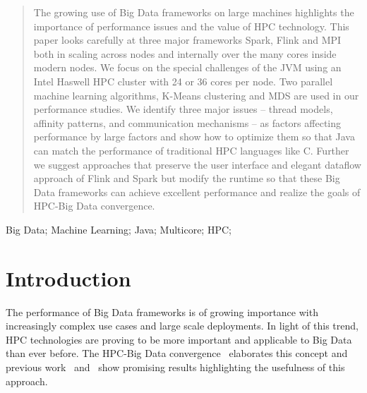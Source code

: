 \documentclass[10pt, conference, compsocconf]{IEEEtran}
\begin{document}
\begin{abstract}
The growing use of Big Data frameworks  on large machines highlights the importance of performance issues and the value of \ac{HPC} technology. This paper looks carefully at three major frameworks Spark, Flink and \ac{MPI} both in scaling across nodes and internally over the many cores inside modern nodes. We focus on the special challenges of the \ac{JVM}  using an Intel   Haswell   \ac{HPC}   cluster   with   24   or  36   cores per  node. Two parallel machine  learning  algorithms,  K-Means  clustering and  \ac{MDS} are used in our performance studies. We identify three major issues --  thread   models,   affinity   patterns,   and communication mechanisms -- as factors affecting performance by large factors and show how to optimize them so that Java can match the performance of traditional \ac{HPC} languages like C. Further we suggest approaches that preserve the user interface and elegant dataflow approach of Flink and Spark but modify the runtime so that these Big Data frameworks can achieve excellent performance and realize the goals of HPC-Big Data convergence.
\end{abstract}

\begin{IEEEkeywords}
Big Data; Machine Learning; Java; Multicore; HPC;
\end{IEEEkeywords}

\acresetall
%
\IEEEpeerreviewmaketitle



\section{Introduction} \label{sec:intro}

The performance of Big Data frameworks is of growing importance with increasingly complex use cases and large scale deployments. In light of this trend, \ac{HPC} technologies are proving to be more important and applicable to Big Data than ever before. The \ac{HPC}-Big Data convergence~\cite{fox1858big} elaborates this concept and previous work~\cite{hpc2016:spidaljava} and~\cite{kamburugamuve2016towards} show promising results highlighting the usefulness of this approach.
\end{document}
